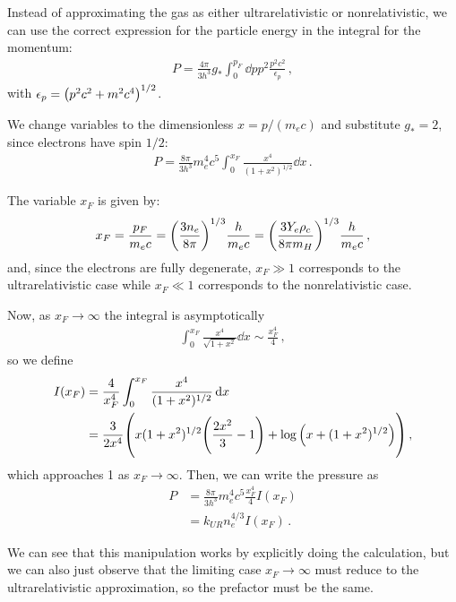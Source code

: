 \documentclass[main.tex]{subfiles}
\begin{document}
Instead of approximating the gas as either ultrarelativistic or nonrelativistic, we can use the correct expression for the particle energy in the integral for the momentum:
%
\begin{align}
P = \frac{4 \pi }{3 h^3} g_{*} \int_{0}^{p_F} \dd{p} p^2 \frac{p^2 c^2}{\epsilon_{p}}
\,,
\end{align}
%
with \(\epsilon_{p} = \qty(p^2c^2 + m^2c^{4})^{1/2}\).

We change variables to the dimensionless \(x = p / (m_e c)\) and substitute \(g_* = 2\), since electrons have spin \(1/2\):
%
\begin{align}
P = \frac{8 \pi }{3 h^3} m_e^4 c^{5} \int_{0}^{x_F} \frac{x^{4}}{(1+x^2)^{1/2}} \dd{x}
\,.
\end{align}

The variable \(x_F\) is given by:
\begin{align}
x_F = \frac{p_F}{m_ec} = 
\qty(\frac{3 n_e}{8 \pi })^{1/3} \frac{h}{m_e c} =
\qty(\frac{3 Y_e \rho_{c}}{8 \pi m_H})^{1/3} \frac{h}{m_e c}
\,,
\end{align}
%
and, since the electrons are fully degenerate, \(x_F \gg 1 \) corresponds to the ultrarelativistic case while \(x_F \ll 1\) corresponds to the nonrelativistic case.

Now, as \(x_F \to \infty \) the integral is asymptotically 
%
\begin{align}
\int_0^{x_F} \frac{x^{4}}{\sqrt{1 + x^2}} \dd{x} \sim \frac{x_F^{4}}{4}
\,,
\end{align}
%
so we define
%
\begin{align}
I(x_F) &= \frac{4}{x_F^{4}}\int_0^{x_F} \frac{x^{4}}{(1 + x^2)^{1/2}} \dd{x} \\
&= \frac{3}{2 x^{4}} \qty( x (1+x^2)^{1/2} \qty(\frac{2x^2}{3} -1) + \log \qty(x + (1+x^2)^{1/2}))
\,,
\end{align}
%
which approaches 1 as \(x_F \to \infty \).
Then, we can write the pressure as 
%
\begin{align}
P &= \frac{8 \pi }{3 h^3} m_e^{4} c^{5} \frac{x_F^{4}}{4} I(x_F)  \\
&= k_{UR} n_e^{4/3} I(x_F)
\,.
\end{align}

We can see that this manipulation works by explicitly doing the calculation, but we can also just observe that the limiting case \(x_F \to \infty \) must reduce to the ultrarelativistic approximation, so the prefactor must be the same.

%
\end{document}

